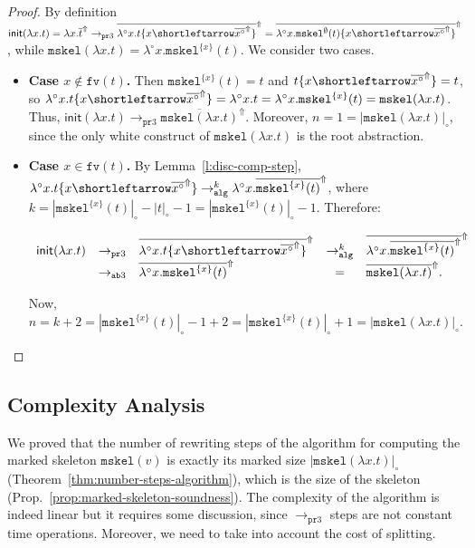 \documentclass[10pt,a4paper]{article}
\theoremstyle{remark}
\newcommand{\la}[1]{\lambda #1.}
\newcommand{\tm}{t}
\newcommand{\var}{x}
\newcommand{\Rew}[1]{\rightarrow_{#1}}
\newcommand{\symfont}[1]{\mathtt{#1}}
\newcommand{\val}{v}
\newcommand{\isub}[2]{\{#1{\shortleftarrow}#2\}}
\renewcommand{\l}{\lambda}
\newcommand{\fv}[1]{\symfont{fv}(#1)}
\newcommand{\reflemma}[1]{Lemma~\ref{l:#1}}
\newcommand{\refthm}[1]{Theorem~\ref{thm:#1}}
\newcommand{\refprop}[1]{Prop.~\ref{prop:#1}}
\newcommand{\set}[1]{\{#1\}}
\newcommand{\sizep}[2]{|#1|_{#2}}
\newcommand{\case}[1]{{\bf Case #1.}}
\newcommand{\taken}{\circ}
\newcommand{\lat}[1]{\l^\taken{#1}.}
\newcommand{\skeld}[1]{\mathsf{init}(#1)}
\newcommand{\frontiersym}{\Uparrow}
\newcommand{\skelu}[1]{\overline{#1}^{\frontiersym}}
\newcommand{\absym}{\symfont{ab}}
\newcommand{\tomarkblthree}{\Rew{\prsym3}}
\newcommand{\tomarkwhthree}{\Rew{\absym3}}
\newcommand{\tomark}{\Rew{\symfont{alg}}}
\newcommand{\disc}[2]{\symfont{disc}^{#2}(#1)}
\renewcommand{\disc}[2]{\symfont{mskel}^{#2}(#1)}
\newcommand{\discabs}[1]{\symfont{mskel}(#1)}
\newcommand{\sizet}[1]{\sizep{#1}{\taken}}
\newcommand{\prsym}{\symfont{pr}}
\begin{document}
\begin{proof}
By definition $\skeld{\la\var\tm} = \la\var\skelu{\tm} \tomarkblthree \skelu{\lat\var\tm\isub\var{\skelu{\var^\taken}} }= \skelu{\lat\var\disc\tm\emptyset\isub\var{\skelu{\var^\taken}}}$, while $\discabs{\la\var\tm} = \lat\var\disc\tm{\set\var}$.
We consider two cases.
\begin{itemize}
\item \case{$\var \notin \fv{\tm}$} Then $\disc\tm{\{\var\}} = \tm$ and $\tm\isub\var{\skelu{\var^\taken}} = \tm$, so $\lat\var\tm\isub\var{\skelu{\var^\taken}}=\lat\var\tm=\lat\var\disc\tm{\{\var\}}=\discabs{\la\var\tm}$. Thus, $\skeld{\la\var\tm} \tomarkblthree \skelu{\discabs{\la\var\tm}}$. Moreover, $n = 1 = \sizet{\discabs{\la\var\tm}}$, since the only white construct of $\discabs{\la\var\tm}$ is the root abstraction.

\item \case{$\var \in \fv{\tm}$}
By \reflemma{disc-comp-step}, $\lat\var\tm\isub\var{\skelu{\var^\taken}} \tomark^k \lat\var\skelu{\disc\tm{\{\var\}}}$, where $k = \sizet{\disc\tm{\{\var\}}} - \sizet{\tm} -1 = \sizet{\disc\tm{\{\var\}}}-1$.
Therefore:
\begin{center}
$\begin{array}{lclcll}
\skeld{\la\var\tm} & \tomarkblthree & \skelu{\lat\var\tm\isub\var{\skelu{\var^\taken}} }
%
& \tomark^{k} & 
\skelu{\lat\var\skelu{\disc\tm{\{\var\}}}}
\\
& \tomarkwhthree & 
\skelu{\lat\var\disc\tm{\{\var\}} }
& = & 
\skelu{\discabs{\la\var\tm}}.
\end{array}$
\end{center}
Now, $n = k + 2 = \sizet{\disc\tm{\{\var\}}} -1 +2 = \sizet{\disc\tm{\{\var\}}} +1= \sizet{\discabs{\la\var\tm}}$.\qedhere
\end{itemize}
\end{proof}


\subsection{Complexity Analysis} 
We proved that the number of rewriting steps of the algorithm for computing the marked skeleton $\discabs{\val}$ is exactly its marked size $\sizet{\discabs{\la\var\tm}}$ (\refthm{number-steps-algorithm}), which is the size of the skeleton (\refprop{marked-skeleton-soundness}). The complexity of the algorithm is indeed linear but it requires some discussion, since $\tomarkblthree$ steps are not constant time operations. Moreover, we need to take into account the cost of splitting.
\end{document}
